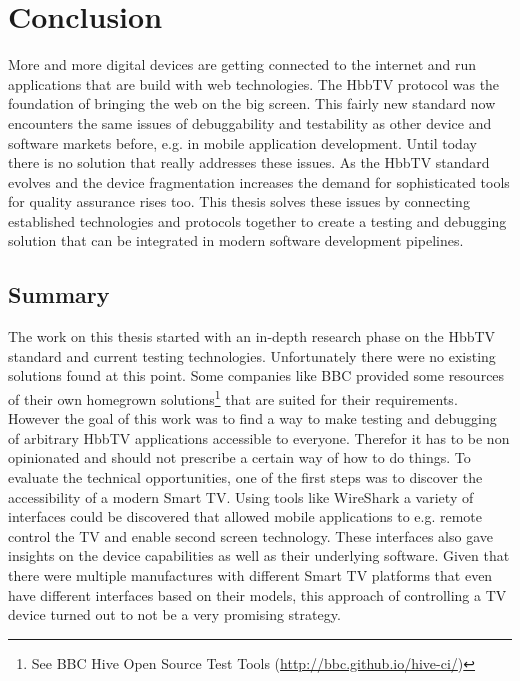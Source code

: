 \chapter{Conclusion\label{cha:chapter7}}

%

More and more digital devices are getting connected to the internet and run applications that are build with web technologies. The HbbTV protocol was the foundation of bringing the web on the big screen. This fairly new standard now encounters the same issues of debuggability and testability as other device and software markets before, e.g. in mobile application development. Until today there is no solution that really addresses these issues. As the HbbTV standard evolves and the device fragmentation increases the demand for sophisticated tools for quality assurance rises too. This thesis solves these issues by connecting established technologies and protocols together to create a testing and debugging solution that can be integrated in modern software development pipelines.

\section{Summary\label{sec:summary}}


The work on this thesis started with an in-depth research phase on the HbbTV standard and current testing technologies. Unfortunately there were no existing solutions found at this point. Some companies like BBC provided some resources of their own homegrown solutions\footnote{See BBC Hive Open Source Test Tools (\url{http://bbc.github.io/hive-ci/})} that are suited for their requirements. However the goal of this work was to find a way to make testing and debugging of arbitrary HbbTV applications accessible to everyone. Therefor it has to be non opinionated and should not prescribe a certain way of how to do things. To evaluate the technical opportunities, one of the first steps was to discover the accessibility of a modern Smart TV. Using tools like WireShark a variety of interfaces could be discovered that allowed mobile applications to e.g. remote control the TV and enable second screen technology. These interfaces also gave insights on the device capabilities as well as their underlying software. Given that there were multiple manufactures with different Smart TV platforms that even have different interfaces based on their models, this approach of controlling a TV device turned out to not be a very promising strategy.

